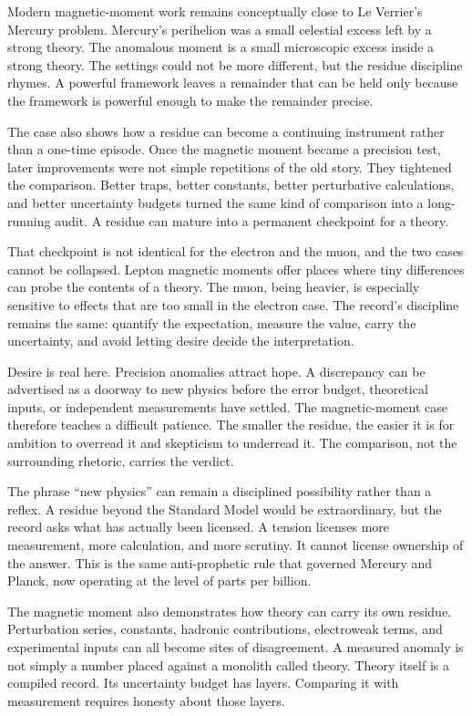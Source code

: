 Modern magnetic-moment work remains conceptually close to Le Verrier's
Mercury problem. Mercury's perihelion was a small celestial excess left by a
strong theory. The anomalous moment is a small microscopic excess inside a
strong theory. The settings could not be more different, but the residue
discipline rhymes. A powerful framework leaves a remainder that can be held
only because the framework is powerful enough to make the remainder precise.

The case also shows how a residue can become a continuing instrument rather
than a one-time episode. Once the magnetic moment became a precision test,
later improvements were not simple repetitions of the old story. They
tightened the comparison. Better traps, better constants, better perturbative
calculations, and better uncertainty budgets turned the same kind of
comparison into a long-running audit. A residue can mature into a permanent
checkpoint for a theory.

That checkpoint is not identical for the electron and the muon, and the two
cases cannot be collapsed. Lepton magnetic moments offer places where tiny
differences can probe the contents of a theory. The muon, being heavier, is
especially sensitive to effects that are too small in the electron case. The
record's discipline remains the same: quantify the expectation, measure the
value, carry the uncertainty, and avoid letting desire decide the
interpretation.

Desire is real here. Precision anomalies attract hope. A discrepancy can be
advertised as a doorway to new physics before the error budget, theoretical
inputs, or independent measurements have settled. The magnetic-moment case
therefore teaches a difficult patience. The smaller the residue, the easier
it is for ambition to overread it and skepticism to underread it. The
comparison, not the surrounding rhetoric, carries the verdict.

The phrase ``new physics'' can remain a disciplined possibility rather than
a reflex. A residue beyond the Standard Model would be extraordinary, but the
record asks what has actually been licensed. A tension
licenses more measurement, more calculation, and more scrutiny. It cannot
license ownership of the answer. This is the same anti-prophetic rule that
governed Mercury and Planck, now operating at the level of parts per billion.

The magnetic moment also demonstrates how theory can carry its own residue.
Perturbation series, constants, hadronic contributions, electroweak terms,
and experimental inputs can all become sites of disagreement. A measured
anomaly is not simply a number placed against a monolith called theory.
Theory itself is a compiled record. Its uncertainty budget has layers.
Comparing it with measurement requires honesty about those layers.

